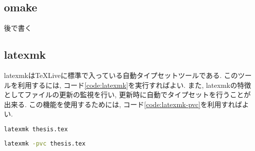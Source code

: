 \subsection{omake}
後で書く

\subsection{latexmk}
latexmkはTeXLiveに標準で入っている自動タイプセットツールである.
このツールを利用するには, コード\ref{code:latexmk}を実行すればよい. 
また, latexmkの特徴としてファイルの更新の監視を行い, 更新時に自動でタイプセットを行うことが出来る.
この機能を使用するためには, コード\ref{code:latexmk-pvc}を利用すればよい.

\begin{minipage}{\textwidth}
\begin{lstlisting}[caption={latexmkコマンド}, label={code:latexmk}, language={sh}]
latexmk thesis.tex
\end{lstlisting}

\begin{lstlisting}[caption={latexmkによる自動タイプセット}, label={code:latexmk-pvc}, language={sh}]
latexmk -pvc thesis.tex
\end{lstlisting}


\end{minipage}